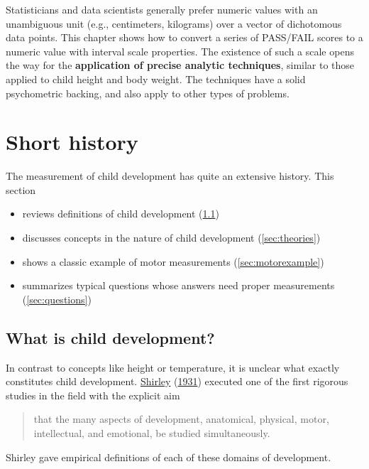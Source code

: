\documentclass[
]{book}
\providecommand{\tightlist}{%
  \setlength{\itemsep}{0pt}\setlength{\parskip}{0pt}}
\begin{document}
Statisticians and data scientists generally prefer numeric values with an unambiguous unit (e.g., centimeters, kilograms) over a vector of dichotomous data points. This chapter shows how to convert a series of PASS/FAIL scores to a numeric value with interval scale properties. The existence of such a scale opens the way for the \textbf{application of precise analytic techniques}, similar to those applied to child height and body weight. The techniques have a solid psychometric backing, and also apply to other types of problems.

\hypertarget{ch:history}{%
\chapter{Short history}\label{ch:history}}

The measurement of child development has quite an extensive history. This section

\begin{itemize}
\tightlist
\item
  reviews definitions of child development (\ref{sec:definitions})
\item
  discusses concepts in the nature of child development (\ref{sec:theories})
\item
  shows a classic example of motor measurements (\ref{sec:motorexample})
\item
  summarizes typical questions whose answers need proper measurements (\ref{sec:questions})
\end{itemize}

\hypertarget{sec:definitions}{%
\section{What is child development?}\label{sec:definitions}}

In contrast to concepts like height or temperature, it is unclear what exactly constitutes child development. \protect\hyperlink{ref-shirley1931}{Shirley} (\protect\hyperlink{ref-shirley1931}{1931}) executed one of the first rigorous studies in the field with the explicit aim

\begin{quote}
that the many aspects of development, anatomical, physical, motor, intellectual, and emotional, be studied simultaneously.
\end{quote}

Shirley gave empirical definitions of each of these domains of development.
\end{document}
